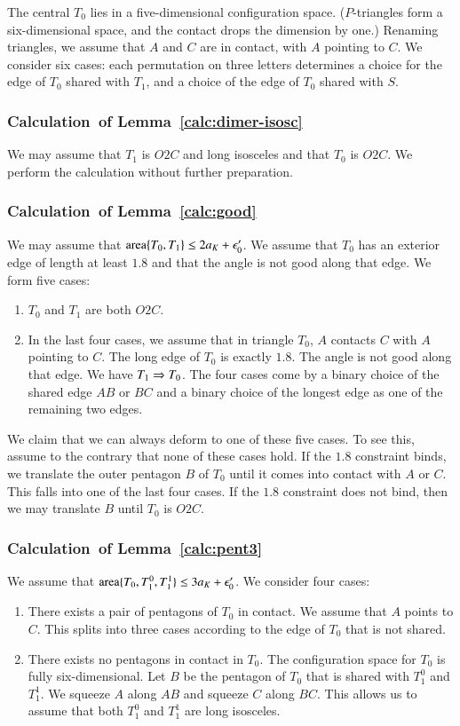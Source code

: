 The central $T_0$ lies in a five-dimensional configuration space. ($P$-triangles form a six-dimensional space,
and the contact drops the dimension by one.)  Renaming triangles, we assume that $A$ and $C$ are in contact,
with $A$ pointing to $C$.  We consider six cases: each permutation on three letters determines a  choice for the edge of $T_0$ shared with $T_1$,
and a choice of the edge of $T_0$ shared with $S$.

\subsubsection{Calculation~of Lemma~\ref{calc:dimer-isosc}}
We may assume that $T_1$ is $O2C$ and long isosceles and that $T_0$ is $O2C$.  We perform the calculation
without further preparation.

\subsubsection{Calculation~of Lemma~\ref{calc:good}} %
We may assume that ${\operatorname{area}}\{T_0,T_1\}\le 2a_K + \epsilon_0'$.  We assume that $T_0$ has an exterior edge of length at least $1.8$
and that the angle is not good along that edge.  We form five cases:
\begin{enumerate}  
\item $T_0$ and $T_1$ are both $O2C$.
\item In the last four cases, we
assume that in triangle $T_0$, $A$ contacts $C$ with $A$ pointing to $C$.  The long edge of $T_0$ is exactly
$1.8$.  The angle is not good along that edge.  We have $T_1\Rightarrow T_0$.
The four cases come by a binary choice of the shared edge $AB$ or $BC$ and a binary choice
of the longest edge as one of the remaining two edges.
\end{enumerate}

We claim that we can always deform to one of these five cases.  To see this, assume to the contrary
that none of these cases hold.  If the $1.8$ constraint binds, we translate the outer pentagon $B$ of $T_0$
until it comes into contact with $A$ or $C$. This falls into one of the last four cases.
If the $1.8$ constraint does not bind, then we may translate $B$ until $T_0$ is $O2C$.

\subsubsection{Calculation~of Lemma~\ref{calc:pent3}} %
We assume that ${\operatorname{area}}\{T_0,T^0_1,T^1_1\}\le 3a_K + \epsilon_0'$.  We consider four cases:
\begin{enumerate}  
\item There exists a pair of pentagons of $T_0$ in contact.  We assume that $A$ points to $C$.
This splits into three cases according to the edge of $T_0$ that is not shared.
\item  There exists no pentagons in contact in $T_0$.  The configuration space for $T_0$
is fully six-dimensional.  Let $B$ be the pentagon of $T_0$
that is shared with $T^0_1$ and $T^1_1$.  We squeeze $A$ along $AB$ and squeeze $C$ along
$BC$.  This allows us to assume that both $T^0_1$ and $T^1_1$ are long isosceles.
\end{enumerate}  

